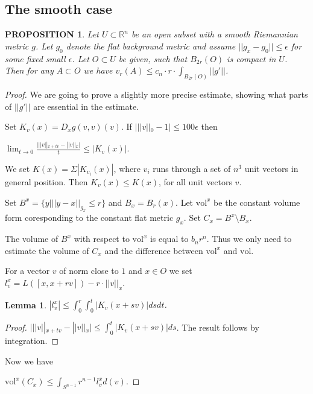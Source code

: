 \documentclass[12pt,leqno]{amsart}
\numberwithin{equation}{section}
\newtheorem{lem}[thm]{Lemma}
\newtheorem{prop}[thm]{PROPOSITION}
\theoremstyle{definition}
\theoremstyle{remark}
\newcommand{\vol}{\mathrm{vol}}
\newcommand{\R}{\mathbb{R}}
\begin{document}
\subsection{The smooth case}

\begin{prop}\label{prop-smooth}
Let $U\subset \R^n$ be an open subset with a smooth Riemannian
metric $g$. Let $g_0$ denote the flat background metric and assume $||g_x-g_0|| \leq \epsilon$ for some fixed small
$\epsilon$.   Let $O\subset U$ be given, such that $B_{2r} (O)$ is compact in $U$.
Then for any $A\subset O$ we have $v_r (A) \leq c_n \cdot r \cdot \int _{B_{2r} ( O)} ||g'||$.
\end{prop}



 \begin{proof}
 We are going to prove a slightly more precise estimate, showing what parts of $||g'||$ are essential in the estimate.


 Set $K_v (x) = D_x g(v,v) (v)$.  If $|||v||_0 -1| \leq 100\epsilon$  then

 $\lim _{t\to 0} \frac {|||v||_{x+tv} - ||v|| _x|} t \leq |K_v (x)|$.

 We set $K(x)= \Sigma |K_{v_i}(x)|$, where $v_i$ runs through a set of $n^3$ unit vectors in general position.
 Then $K_v(x) \leq K (x)$, for all unit vectors $v$.

 Set $B^x = \{ y | ||y-x|| _{g_x} \leq r \}$ and $B_x = B_r (x)$.  Let $\vol ^x$ be the constant
 volume form coresponding to the constant flat metric $g_x$.
   Set $C_x = B^x \setminus B_x$.

   The volume of $B^x$ with respect to $\vol ^x$ is equal to $b_n r^n$. Thus we only need to estimate
  the volume of $C_x$ and the difference between $\vol ^x$ and $\vol$.

 For a vector $v$ of norm close to $1$ and $x\in O$ we set
 $l_v ^x = L ([x,x+rv]) - r \cdot || v|| _x$.

 \begin{lem}
 $|l_v ^x| \leq \int _0 ^r  \int _0 ^t | K_v (x+sv)| ds dt$.
 \end{lem}


 \begin{proof}
 $|||v||_{x+tv} -||v|| _x| \leq \int _0 ^t  |K_v (x+sv)| ds$. The result follows by integration.
  \end{proof}


   Now we have

   $\vol ^x (C_x) \leq \int _{S^{n-1}} r^{n-1} l^x _v d(v) $.



\end{proof}
\end{document}
